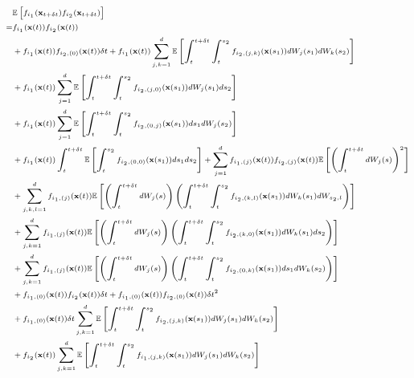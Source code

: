 \begin{equation} \label{eq:E12}
\scriptsize
\begin{aligned}
&\mathbb{E} \left[ f_{i_1}(\mathbf{x}_{t + \delta t}) f_{i_2}(\mathbf{x}_{t + \delta t}) \right] \\
=& 
f_{i_1}(\mathbf{x}(t)) f_{i_2}(\mathbf{x}(t)) \\
&+  f_{i_1}(\mathbf{x}(t)) f_{{i_2},(0)}(\mathbf{x}(t)) \delta t
+ f_{i_1}(\mathbf{x}(t)) \sum_{j, k=1}^\lowdim \mathbb{E} \left[ \int_t^{t+\delta t} \int_t^{s_2} f_{{i_2}, (j,k)}(\mathbf{x}(s_1)) dW_j(s_1) dW_k(s_2) \right] \\
&+ f_{i_1}(\mathbf{x}(t)) \sum_{j=1}^\lowdim \mathbb{E}  \left[ \int_t^{t+\delta t} \int_t^{s_2} f_{{i_2}, (j,0)}(\mathbf{x}(s_1)) dW_j(s_1) ds_2 \right] \\
& + f_{i_1}(\mathbf{x}(t)) \sum_{j=1}^\lowdim \mathbb{E} \left[ \int_t^{t+\delta t} \int_t^{s_2} f_{{i_2}, (0,j)}(\mathbf{x}(s_1)) ds_1 dW_j(s_2) \right] \\
&+ f_{i_1}(\mathbf{x}(t)) \int_t^{t+\delta t} \mathbb{E} \left[ \int_t^{s_2} f_{{i_2}, (0,0)}(\mathbf{x}(s_1)) ds_1 ds_2 \right]
+  \sum_{j=1}^\lowdim f_{{i_1},(j)}(\mathbf{x}(t)) f_{{i_2},(j)}(\mathbf{x}(t)) \mathbb{E} \left[ \left( \int_t^{t + \delta t} dW_j(s) \right)^2 \right] \\
&+ \sum_{j,k,l=1}^\lowdim f_{{i_1},(j)}(\mathbf{x}(t)) \mathbb{E} \left[ \left( \int_t^{t + \delta t} dW_j(s) \right) \left( \int_t^{t+\delta t} \int_t^{s_2} f_{{i_2},(k,l)}(\mathbf{x}(s_1)) dW_k(s_1) dW_{s_2, l} \right) \right] \\
&+ \sum_{j,k=1}^\lowdim f_{{i_1},(j)}(\mathbf{x}(t)) \mathbb{E} \left[ \left( \int_t^{t + \delta t} dW_j(s) \right)\left( \int_t^{t+\delta t} \int_t^{s_2} f_{{i_2},(k,0)}(\mathbf{x}(s_1)) dW_k(s_1) ds_2 \right) \right]\\
&+ \sum_{j, k=1}^\lowdim f_{{i_1},(j)}(\mathbf{x}(t)) \mathbb{E} \left[ \left( \int_t^{t + \delta t} dW_j(s) \right) \left( \int_t^{t+\delta t} \int_t^{s_2} f_{{i_2},(0,k)}(\mathbf{x}(s_1)) ds_1 dW_k(s_2) \right) \right] \\
&+f_{{i_1},(0)}(\mathbf{x}(t)) f_{i_2}(\mathbf{x}(t)) \delta t
+  f_{{i_1},(0)}(\mathbf{x}(t))f_{{i_2},(0)}(\mathbf{x}(t)) \delta t^2 \\
& +  f_{{i_1},(0)}(\mathbf{x}(t)) \delta t \sum_{j, k=1}^\lowdim \mathbb{E} \left[ \int_t^{t+\delta t} \int_t^{s_2} f_{{i_2},(j,k)}(\mathbf{x}(s_1)) dW_j(s_1) dW_k(s_2) \right] \\
&+f_{i_2}(\mathbf{x}(t)) \sum_{j, k=1}^\lowdim \mathbb{E} \left[ \int_t^{t+\delta t} \int_t^{s_2} f_{{i_1},(j,k)}(\mathbf{x}(s_1)) dW_j(s_1) dW_k(s_2) \right] \\

\end{aligned}
\end{equation}
